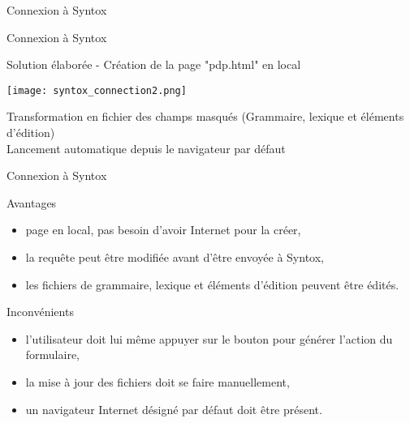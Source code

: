 \documentclass[11pt]{beamer}
\begin{document}
\begin{frame}{Connexion à Syntox}

\begin{itemize}
\end{itemize}
\end{frame}

\begin{frame}{Connexion à Syntox}
\begin{block}{Solution élaborée - Création de la page "pdp.html" en local}

\begin{center}
\texttt{[image: syntox\_connection2.png]}
\end{center}
Transformation en fichier des champs masqués (Grammaire, lexique et éléments d'édition)
\\ Lancement automatique depuis le navigateur par défaut
\end{block}
\end{frame}

\begin{frame}{Connexion à Syntox}
\begin{block}{Avantages}
\begin{itemize}
\item page en local, pas besoin d'avoir Internet pour la créer,
\item la requête peut être modifiée avant d'être envoyée à Syntox,
\item les fichiers de grammaire, lexique et éléments d'édition peuvent être édités.
\end{itemize}
\end{block}
\begin{block}{Inconvénients}
\begin{itemize}
\item l'utilisateur doit lui même appuyer sur le bouton pour générer l'action du formulaire,
\item la mise à jour des fichiers doit se faire manuellement,
\item un navigateur Internet désigné par défaut doit être présent.
\end{itemize}
\end{block}
\end{frame}
\end{document}
